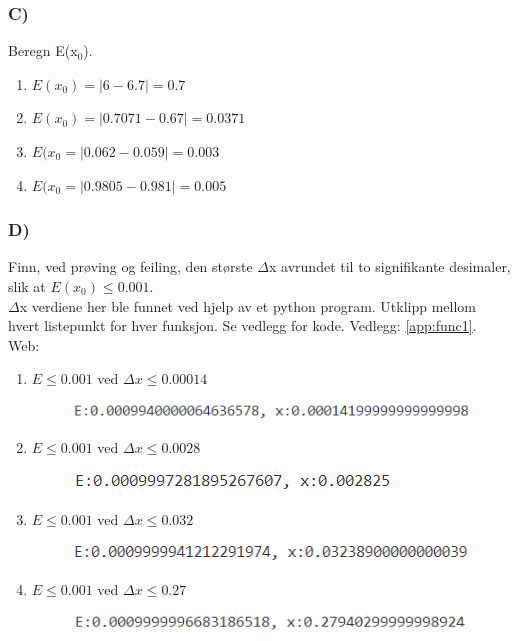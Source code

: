 \subsubsection{C)}
    Beregn E(x$_{0}$).
    \begin{enumerate}
        \item $E(x_{0})=|6-6.7|=0.7$
        \item $E(x_{0})=|0.7071-0.67|=0.0371$
        \item $E(x_{0}=|0.062-0.059|=0.003$
        \item $E(x_{0}=|0.9805-0.981|=0.005$
    \end{enumerate}
\subsubsection{D)}
Finn, ved prøving og feiling, den største $\Delta$x avrundet til to signifikante desimaler, slik at $E(x_{0}) \leq 0.001$.
\\
$\Delta$x verdiene her ble funnet ved hjelp av et python program. Utklipp mellom hvert listepunkt for hver funksjon. Se vedlegg for kode. Vedlegg: \ref{app:func1}. Web: \cite{github}
\begin{enumerate}
    \item $E\leq 0.001$ ved  $\Delta x \leq 0.00014$
    \begin{figure}[h]
    \centering
    \includegraphics{Figures/del1_1d_1.png}
    \end{figure}
    \item $E\leq 0.001$ ved  $\Delta x \leq 0.0028$
    \begin{figure}[h]
    \centering
    \includegraphics{Figures/del1_1d_2.png}
    \end{figure}
    \item $E\leq 0.001$ ved  $\Delta x \leq 0.032$
    \begin{figure}[h]
    \centering
    \includegraphics{Figures/del1_1d_3.png}
    \end{figure}
    \item $E\leq 0.001$ ved  $\Delta x \leq 0.27$
    \begin{figure}[h!]
    \centering
    \includegraphics{Figures/del1_1d_4.png}
    \end{figure}
\end{enumerate}
\newpage

